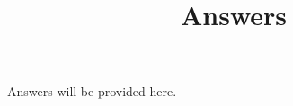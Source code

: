 \documentclass{ximera}
\title{Answers}
\begin{document}
\maketitle
Answers will be provided here.
\end{document}
